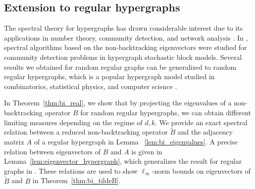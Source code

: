 \documentclass[11pt,reqno]{amsart}
\theoremstyle{definition}
\begin{document}

\subsection{Extension to regular hypergraphs}
 The spectral theory for hypergraphs has drawn considerable interest due to its applications in number theory, community detection, and network analysis \cite{feng1996spectra,li2004ramanujan,sole1996spectra,storm2006zeta}. In \cite{angelini2015spectral,stephan2022sparse,chodrow2023nonbacktracking},  spectral algorithms based on the non-backtracking eigenvectors were studied for community detection problems in hypergraph stochastic block models. Several results we obtained for random regular graphs can be generalized to random regular hypergraphs, which is a popular hypergraph model studied in combinatorics, statistical physics, and computer science \cite{cooper1996perfect,dumitriu2021spectra,greenhill2022spanning,chang2023upper,sen2018optimization}.
 
 In Theorem~\ref{thm:bi_real}, we show that by projecting the eigenvalues of a non-backtracking operator $B$ for random regular hypergraphs, we can obtain different limiting measures depending on the regime of $d,k$. We provide an exact spectral relation between a reduced non-backtracking operator $\tilde B$ and the adjacency matrix $A$ of a regular hypergraph in Lemma~ \ref{lem:bi_eigenvalues}.  A precise relation between eigenvectors of $B$ and $A$ is given in  Lemma~\ref{lem:eigenvector_hypergraph}, which generalizes the result for regular graphs in \cite{lubetzky2016cutoff}. These relations are used to show $\ell_{\infty}$-norm {bounds} on eigenvectors of $\tilde B$ and $B$ in Theorem~\ref{thm:bi_tildeB}.
\end{document}
